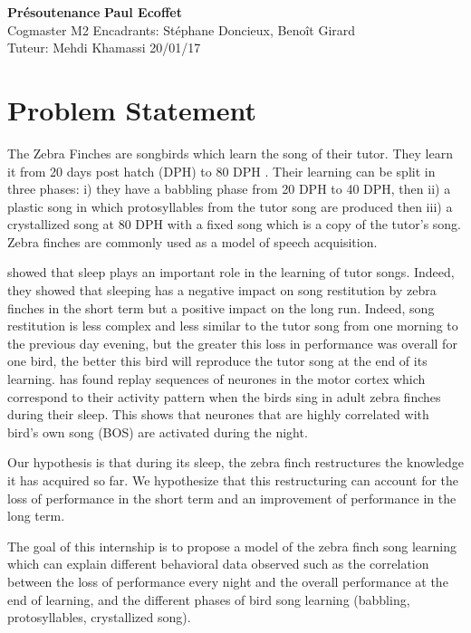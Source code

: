 \documentclass[a4paper, 11pt]{article}
\begin{document}
\noindent
\large\textbf{Présoutenance} \hfill \textbf{Paul Ecoffet} \\
\normalsize Cogmaster M2 \hfill Encadrants: Stéphane Doncieux, Benoît Girard \\
Tuteur: Mehdi Khamassi \hfill 20/01/17

\section*{Problem Statement}

The Zebra Finches are songbirds which learn the song of their tutor. They learn
it from 20 days post hatch (DPH) to 80 DPH \parencite{liu_juvenile_2004}. Their
learning can be split in three phases: i) they have a babbling phase from 20 DPH
to 40 DPH, then ii) a plastic song in which protosyllables from the tutor song
are produced then iii) a crystallized song at 80 DPH with a fixed song which is
a copy of the tutor's song. Zebra finches are commonly used
as a model of speech acquisition.

\textcite{deregnaucourt_how_2005} showed that sleep plays an important role in
the learning of tutor songs. Indeed, they showed that sleeping has a negative
impact on song restitution by zebra finches in the short term but a positive
impact on the long run. Indeed, song restitution is less complex and less
similar to the tutor song from one morning to the previous day evening, but the
greater this loss in performance was overall for one bird, the better this bird
will reproduce the tutor song at the end of its learning.
\textcite{dave_song_2000} has found replay sequences of neurones in the motor
cortex which correspond to their activity pattern when the birds sing in adult
zebra finches during their sleep. This shows that neurones that are highly
correlated with bird's own song (BOS) are activated during the night.

Our hypothesis is that during its sleep, the zebra finch restructures the
knowledge it has acquired so far. We hypothesize that this restructuring can
account for the loss of performance in the short term and an improvement of
performance in the long term.

The goal of this internship is to propose a model of the zebra finch song
learning which can explain different behavioral data observed such as the
correlation between the loss of performance every night and the overall
performance at the end of learning, and the different phases of bird song
learning (babbling, protosyllables, crystallized song).
\end{document}
